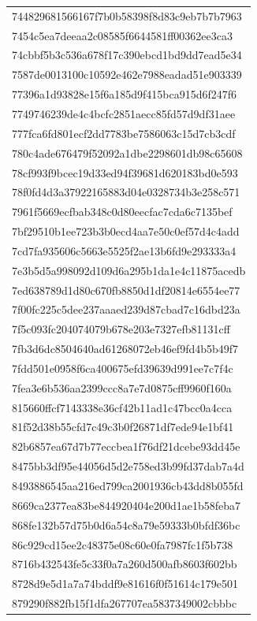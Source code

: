 \begin{tabular}{l}
744829681566167f7b0b58398f8d83c9eb7b7b7963 \\
7454c5ea7deeaa2c08585f6644581ff00362ee3ca3 \\
74cbbf5b3c536a678f17c390ebcd1bd9dd7ead5e34 \\
7587de0013100c10592e462e7988eadad51e903339 \\
77396a1d93828e15f6a185d9f415bca915d6f247f6 \\
7749746239de4c4bcfc2851aecc85fd57d9df31aee \\
777fca6fd801ecf2dd7783be7586063c15d7cb3cdf \\
780c4ade676479f52092a1dbe2298601db98c65608 \\
78cf993f9bcec19d33ed94f39681d620183bd0e593 \\
78f0fd4d3a37922165883d04e0328734b3e258c571 \\
7961f5669ecfbab348c0d80eecfac7cda6c7135bef \\
7bf29510b1ee723b3b0ecd4aa7e50c0ef57d4c4add \\
7cd7fa935606c5663e5525f2ae13b6fd9e293333a4 \\
7e3b5d5a998092d109d6a295b1da1e4c11875acedb \\
7ed638789d1d80c670fb8850d1df20814e6554ee77 \\
7f00fc225c5dee237aaaed239d87cbad7c16dbd23a \\
7f5c093fc204074079b678e203e7327efb81131cff \\
7fb3d6dc8504640ad61268072eb46ef9fd4b5b49f7 \\
7fdd501e0958f6ca400675efd39639d991ee7c7f4c \\
7fea3e6b536aa2399ccc8a7e7d0875cff9960f160a \\
815660ffcf7143338e36cf42b11ad1c47bcc0a4cca \\
81f52d38b55cfd7c49c3b0f26871df7ede94e1bf41 \\
82b6857ea67d7b77eccbea1f76df21dcebe93dd45e \\
8475bb3df95e44056d5d2e758ed3b99fd37dab7a4d \\
8493886545aa216ed799ca2001936cb43dd8b055fd \\
8669ca2377ea83be844920404e200d1ae1b58feba7 \\
868fe132b57d75b0d6a54c8a79e59333b0bfdf36bc \\
86c929cd15ee2c48375e08c60e0fa7987fc1f5b738 \\
8716b432543fe5c33f0a7a260d500afb8603f602bb \\
8728d9e5d1a7a74bddf9e81616f0f51614c179e501 \\
879290f882fb15f1dfa267707ea5837349002cbbbc \\

\end{tabular}

